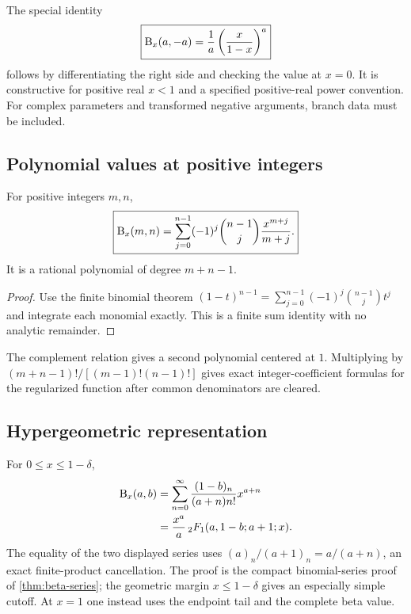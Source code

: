 The special identity
\begin{equation}
 \boxed{\mathrm B_x(a,-a)=\frac1a\left(\frac{x}{1-x}\right)^a}
 \label{eq:inc-special}
\end{equation}
follows by differentiating the right side and checking the value at $x=0$.  It is constructive for positive real $x<1$ and a specified positive-real power convention.  For complex parameters and transformed negative arguments, branch data must be included.

\subsection{Polynomial values at positive integers}

\begin{theorem}\label{thm:inc-polynomial}
For positive integers $m,n$,
\begin{equation}
 \boxed{
 \mathrm B_x(m,n)=
 \sum_{j=0}^{n-1}(-1)^j\binom{n-1}{j}
 \frac{x^{m+j}}{m+j}.}
 \label{eq:inc-poly}
\end{equation}
It is a rational polynomial of degree $m+n-1$.
\end{theorem}

\begin{proof}
Use the finite binomial theorem
$(1-t)^{n-1}=\sum_{j=0}^{n-1}(-1)^j\binom{n-1}{j}t^j$
and integrate each monomial exactly.  This is a finite sum identity with no analytic remainder.
\end{proof}

The complement relation gives a second polynomial centered at $1$.  Multiplying by $(m+n-1)!/[(m-1)!(n-1)!]$ gives exact integer-coefficient formulas for the regularized function after common denominators are cleared.

\subsection{Hypergeometric representation}

For $0\le x\le1-\delta$,
\begin{align}
 \mathrm B_x(a,b)
 &=\sum_{n=0}^{\infty}
   \frac{(1-b)_n}{(a+n)n!}x^{a+n}
 \label{eq:inc-series}\\
 &=\frac{x^a}{a}\,
 {}_2F_1(a,1-b;a+1;x).
 \label{eq:inc-hyper}
\end{align}
The equality of the two displayed series uses
$(a)_n/(a+1)_n=a/(a+n)$, an exact finite-product cancellation.  The proof is the compact binomial-series proof of \cref{thm:beta-series}; the geometric margin $x\le1-\delta$ gives an especially simple cutoff.  At $x=1$ one instead uses the endpoint tail and the complete beta value.


